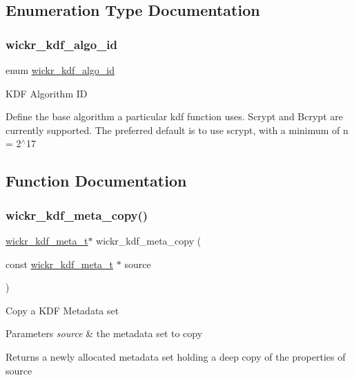 \subsection{Enumeration Type Documentation}
\mbox{\label{group__wickr__kdf_ga106149e3507106abb6b5be843a4e7c16}} 
\subsubsection{\texorpdfstring{wickr\+\_\+kdf\+\_\+algo\+\_\+id}{wickr\_kdf\_algo\_id}}
{\footnotesize\ttfamily enum \hyperlink{group__wickr__kdf_ga106149e3507106abb6b5be843a4e7c16}{wickr\+\_\+kdf\+\_\+algo\+\_\+id}}

K\+DF Algorithm ID

Define the base algorithm a particular kdf function uses. Scrypt and Bcrypt are currently supported. The preferred default is to use scrypt, with a minimum of n = 2$^\wedge$17 

\subsection{Function Documentation}
\mbox{\label{group__wickr__kdf_ga6ed878108fd58ee420239689de505190}} 
\subsubsection{\texorpdfstring{wickr\+\_\+kdf\+\_\+meta\+\_\+copy()}{wickr\_kdf\_meta\_copy()}}
{\footnotesize\ttfamily \hyperlink{structwickr__kdf__meta}{wickr\+\_\+kdf\+\_\+meta\+\_\+t}$\ast$ wickr\+\_\+kdf\+\_\+meta\+\_\+copy (\begin{DoxyParamCaption}\item[{const \hyperlink{structwickr__kdf__meta}{wickr\+\_\+kdf\+\_\+meta\+\_\+t} $\ast$}]{source }\end{DoxyParamCaption})}

Copy a K\+DF Metadata set


\begin{DoxyParams}{Parameters}
{\em source} & the metadata set to copy \\
\hline
\end{DoxyParams}
\begin{DoxyReturn}{Returns}
a newly allocated metadata set holding a deep copy of the properties of \textquotesingle{}source\textquotesingle{} 
\end{DoxyReturn}
\mbox{\label{group__wickr__kdf_gaf8d52b4e277d4e0eff6b60a510831b8c}} 
